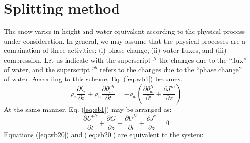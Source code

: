 \section{Splitting method}
The snow varies in height and water equivalent according to the physical process under consideration. In general, we may assume that the physical processes are a combination of three activities: (i) phase change, (ii) water fluxes, and (iii) compression. 
Let us indicate with the superscript $^{fl}$ the changes due to the ``flux'' of water, and the superscript $^{ph}$ refers to the changes due to the ``phase change'' of water. 
According to this scheme, Eq. (\ref{eq:wb1}) 
becomes:
%
%
\begin{equation}\label{eq:wb20}
\rho_i \frac{\partial \theta_i}{\partial t} + \rho_w \frac{\partial \theta_w^{ph}}{\partial t}= -\rho_w \left(\frac{\partial \theta_w^{fl}}{\partial t}+ \frac{\partial J^m}{\partial z}\right) 
\end{equation}
%
At the same manner, Eq. (\ref{eq:eb1}) may be arranged as:
\begin{equation}\label{eq:eb20}
\frac{\partial U^{ph}}{\partial t} + \frac{\partial G}{\partial z}+\frac{\partial U^{fl}}{\partial t} +\frac{\partial J^e}{\partial z}=0
\end{equation}
%
Equations (\ref{eq:wb20}) and (\ref{eq:eb20}) are equivalent to the system:
